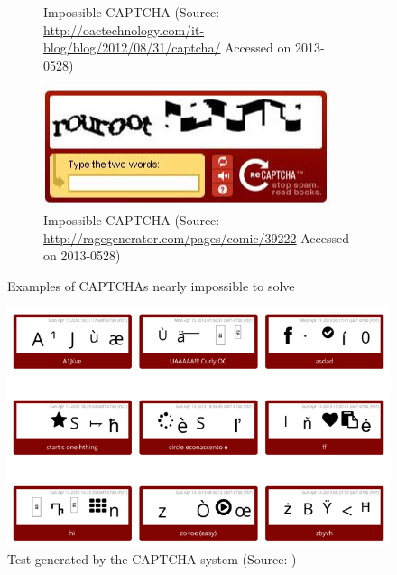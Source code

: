 \documentclass[pdftex,a4paper,12pt,twoside]{report}
\theoremstyle{plain} \newtheorem{theorem}{Theorem} \newtheorem{proposition}{Proposition} \newtheorem{lemma}{Lemma} \newtheorem*{corollary}{Corollary}
\theoremstyle{definition} \newtheorem{definition}{Definition} \newtheorem{conjecture}{Conjecture} \newtheorem*{example}{Example} \newtheorem{algorithm}{Algorithm}
\theoremstyle{remark} \newtheorem*{remark}{Remark} \newtheorem*{note}{Note} \newtheorem{case}{Case}
\begin{document}
\begin{figure}
\begin{subfigure}[b]{0.65\textwidth}
		\caption{Impossible CAPTCHA (Source: \url{http://oactechnology.com/it-blog/blog/2012/08/31/captcha/} Accessed on 2013-0528)}
	\end{subfigure}
	\begin{subfigure}[b]{0.65\textwidth}
		\centering
		\includegraphics[width=\textwidth]{./img/impossible_captcha04.png}
		\caption{Impossible CAPTCHA (Source: \url{http://ragegenerator.com/pages/comic/39222} Accessed on 2013-0528)}
	\end{subfigure}
	\caption{Examples of CAPTCHAs nearly impossible to solve}
	\label{fig:ImpossibleCaptcha}
\end{figure}
\begin{figure}
	\centering
	\includegraphics[width=\textwidth]{./img/CRAPCHA.png}
	\caption{Test generated by the CAPTCHA system (Source: \citep{Lsquid2013})}
	\label{fig:CRAPCHA}
\end{figure}
\end{document}
